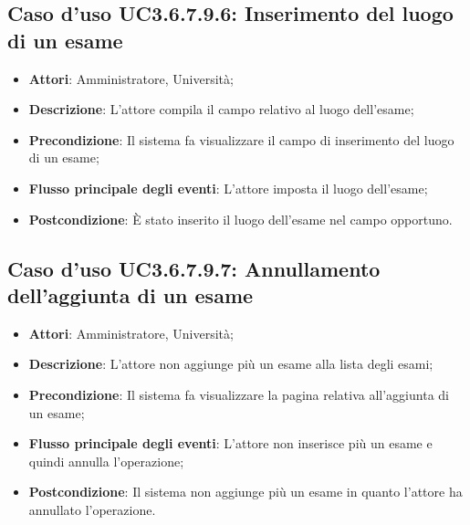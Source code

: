 \subsection{Caso d'uso \texorpdfstring{UC3.6.7.9.6}{UC3.6.7.9.6}: Inserimento del luogo di un esame}
\begin{itemize}
\item \textbf{Attori}: Amministratore, Università;
\item \textbf{Descrizione}: L'attore compila il campo relativo al luogo dell’esame;

\item \textbf{Precondizione}: Il sistema fa visualizzare il campo di inserimento del luogo di un esame;

\item \textbf{Flusso principale degli eventi}: L'attore imposta il luogo dell’esame;

\item \textbf{Postcondizione}: È stato inserito il luogo dell'esame nel campo opportuno.

\end{itemize}
\subsection{Caso d'uso \texorpdfstring{UC3.6.7.9.7}{UC3.6.7.9.7}: Annullamento dell’aggiunta di un esame}
\begin{itemize}
\item \textbf{Attori}: Amministratore, Università;
\item \textbf{Descrizione}: L'attore non aggiunge più un esame alla lista degli esami;

\item \textbf{Precondizione}: Il sistema fa visualizzare la pagina relativa all'aggiunta di un esame;

\item \textbf{Flusso principale degli eventi}: L'attore non inserisce più un esame e quindi annulla l'operazione;

\item \textbf{Postcondizione}: Il sistema non aggiunge più un esame in quanto l'attore ha annullato l'operazione.
\end{itemize}
